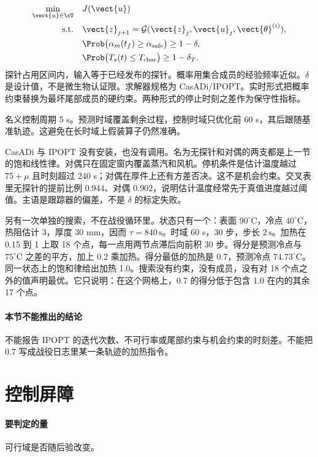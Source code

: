 \begin{equation}
\label{eq:mpc}
\begin{aligned}
\min_{\vect{u}\in\cU}\quad & J(\vect{u})\\
\mathrm{s.t.}\quad
&\vect{z}_{j+1}=\mathcal{G}(\vect{z}_j,\vect{u}_j,\vect{\theta}^{(i)}),\\
&\Prob\big(\alpha_m(t_f)\ge\alpha_{\mathrm{safe}}\big)\ge 1-\delta,\\
&\Prob\big(T_s(t)\le T_{\mathrm{char}}\big)\ge 1-\delta_T.
\end{aligned}
\end{equation}
探针占用区间内，输入等于已经发布的探针。概率用集合成员的经验频率近似。\(\delta\) 是设计值，不是微生物认证限。求解器规格为 CasADi/IPOPT。实时形式把概率约束替换为最坏尾部成员的硬约束。两种形式的停止时刻之差作为保守性指标。

名义控制周期 5 s。预测时域覆盖剩余过程，控制时域只优化前 60 s，其后跟随基准轨迹。这避免在长时域上假装算子仍然准确。

CasADi 与 IPOPT 没有安装，也没有调用。名为无探针和对偶的两支都是上一节的饱和线性律。对偶只在固定窗内覆盖蒸汽和风机。停机条件是估计温度越过 \(75+\mu\) 且时刻超过 240 s；对偶在厚件上还有方差否决。这不是机会约束。交叉表里无探针的提前比例 \(0.944\)、对偶 \(0.902\)，说明估计温度经常先于真值进度越过阈值。主语是跟踪器的偏差，不是 \(\delta\) 的标定失败。

另有一次单独的搜索，不在战役循环里。状态只有一个：表面 \(90^\circ\mathrm{C}\)，冷点 \(40^\circ\mathrm{C}\)，热阻估计 3，厚度 30 mm，因而 \(\tau=840\,\mathrm{s}\)。时域 60 s，30 步，步长 \(2\,\mathrm{s}\)。加热在 0.15 到 1 上取 18 个点，每一点用两节点滞后向前积 30 步。得分是预测冷点与 \(75^\circ\mathrm{C}\) 之差的平方，加上 \(0.2\) 乘加热。得分最低的加热是 0.7，预测冷点 \(74.73^\circ\mathrm{C}\)。同一状态上的饱和律给出加热 1.0。搜索没有约束，没有成员，没有对 18 个点之外的值声明最优。它只说明：在这个网格上，0.7 的得分低于包含 1.0 在内的其余 17 个点。

\paragraph{本节不能推出的结论}
不能报告 IPOPT 的迭代次数、不可行率或尾部约束与机会约束的时刻差。不能把 0.7 写成战役日志里某一条轨迹的加热指令。

\section{控制屏障}

\paragraph{要判定的量}
可行域是否随后验改变。


